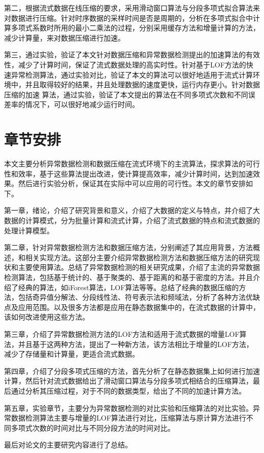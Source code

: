 第二，根据流式数据在线压缩的要求，采用滑动窗口算法与分段多项式拟合算法来对数据进行压缩。针对时序数据的采样时间是否是周期的，分析在多项式拟合中计算多项式系数时所用的最小二乘法的过程，分别采用缓存方法和增量计算的方法，减少计算量，来对数据压缩进行加速。

第三，通过实验，验证了本文针对数据压缩和异常数据检测提出的加速算法的有效性，减少了计算时间，保证了流式数据处理的高实时性。针对基于LOF方法的快速异常检测算法，通过实验对比，验证了本文的算法可以很好地适用于流式计算环境中，并且取得较好的结果，并且处理数据的速度更快，运行内存更小。针对数据压缩的加速   算法，通过实验，验证了本文提出的算法在不同多项式次数和不同误差率的情况下，可以很好地减少运行时间。

\section{章节安排}
本文主要分析异常数据检测和数据压缩在流式环境下的主流算法，探求算法的可行性和效率，基于这些算法提出改进，使计算提高效率，减少计算时间，达到加速效果。然后进行实验分析，保证其在实际中可以应用的可行性。本文的章节安排如下。

第一章，绪论，介绍了研究背景和意义，介绍了大数据的定义与特点，并介绍了大数据的计算模式，分为批量计算和流式计算，介绍了流式数据的特点和流式数据的处理计算模型。

第二章，针对异常数据检测方法和数据压缩方法，分别阐述了其应用背景，方法概述，和相关实现方法。这部分主要介绍异常数据检测方法和数据压缩方法的研究现状和主要使用算法。总结了异常数据检测的相关研究成果，介绍了主流的异常数据检测算法，包括基于统计的、基于聚类的、基于距离的和基于密度的方法。并且介绍了经典的算法，如iForest算法，LOF算法等等。总结了经典的数据压缩的方法，包括奇异值分解法、分段线性法、符号表示法和频域法，分析了各种方法优缺点及应用范围。以及很多方法都是应用在静态数据集中的，在流式数据的计算中，该如何改进使用这些方法。

第三章，介绍了异常数据检测方法的LOF方法和适用于流式数据的增量LOF算法，并且基于这两种方法，提出了一种新方法，该方法相比于增量的LOF方法，减少了存储量和计算量，更适合流式数据。

第四章，介绍了分段多项式压缩的方法，首先分析了在静态数据集上如何进行加速计算，然后针对流式数据给出了滑动窗口算法与分段多项式相结合的压缩算法，最后通过分析其压缩过程，对于不同的数据类型，给出了不同的加速计算方法。

第五章，实验章节，主要分为异常数据检测的对比实验和压缩算法的对比实验。异常数据检测算法主要与增量的LOF算法进行对比，压缩算法与原计算方法进行不同多项式次数的时间对比与不同分段方法的时间对比。

最后对论文的主要研究内容进行了总结。
